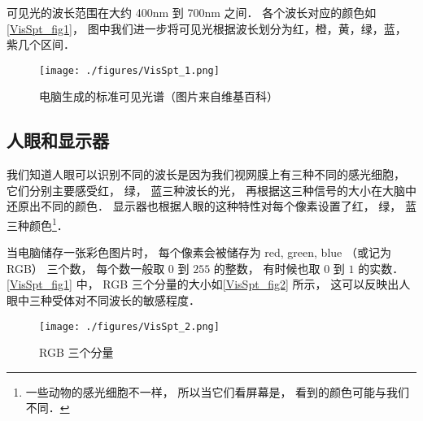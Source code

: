 
可见光的波长范围在大约 400nm 到 700nm 之间． 各个波长对应的颜色如\autoref{VisSpt_fig1}， 图中我们进一步将可见光根据波长划分为红，橙，黄，绿，蓝，紫几个区间．

\begin{figure}[ht]
\centering
\texttt{[image: ./figures/VisSpt\_1.png]}
\caption{电脑生成的标准可见光谱（图片来自维基百科）} \label{VisSpt_fig1}
\end{figure}

\subsection{人眼和显示器}
我们知道人眼可以识别不同的波长是因为我们视网膜上有三种不同的感光细胞， 它们分别主要感受红， 绿， 蓝三种波长的光， 再根据这三种信号的大小在大脑中还原出不同的颜色． 显示器也根据人眼的这种特性对每个像素设置了红， 绿， 蓝三种颜色\footnote{一些动物的感光细胞不一样， 所以当它们看屏幕是， 看到的颜色可能与我们不同．}．

当电脑储存一张彩色图片时， 每个像素会被储存为 red, green, blue （或记为 RGB） 三个数， 每个数一般取 $0$ 到 $255$ 的整数， 有时候也取 $0$ 到 $1$ 的实数． \autoref{VisSpt_fig1} 中， RGB 三个分量的大小如\autoref{VisSpt_fig2} 所示， 这可以反映出人眼中三种受体对不同波长的敏感程度．

\begin{figure}[ht]
\centering
\texttt{[image: ./figures/VisSpt\_2.png]}
\caption{RGB 三个分量} \label{VisSpt_fig2}
\end{figure}
